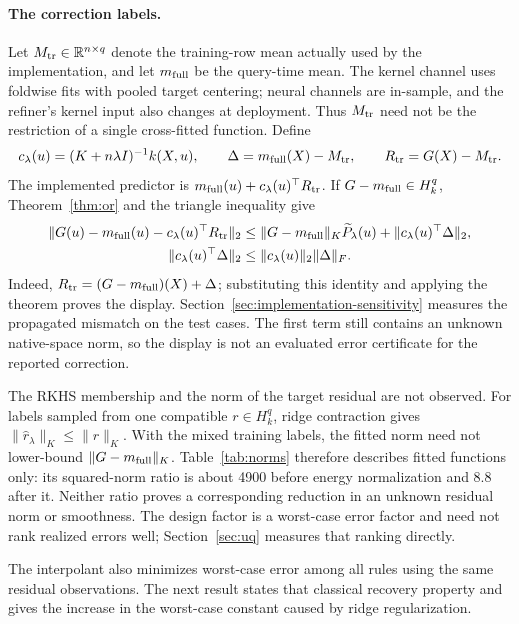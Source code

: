 \paragraph{The correction labels.}
Let $M_{\rm tr}\in\mathbb R^{n\times q}$ denote the training-row mean actually used by the implementation, and let $m_{\rm full}$ be the query-time mean. The kernel channel uses foldwise fits with pooled target centering; neural channels are in-sample, and the refiner's kernel input also changes at deployment. Thus $M_{\rm tr}$ need not be the restriction of a single cross-fitted function. Define
\[
 c_\lambda(u)=(K+n\lambda I)^{-1}k(X,u),\qquad
 \Delta=m_{\rm full}(X)-M_{\rm tr},\qquad
 R_{\rm tr}=G(X)-M_{\rm tr}.
\]
The implemented predictor is $m_{\rm full}(u)+c_\lambda(u)^\top R_{\rm tr}$. If $G-m_{\rm full}\in H_k^q$, Theorem~\ref{thm:or} and the triangle inequality give
\begin{align}
\|G(u)-m_{\rm full}(u)-c_\lambda(u)^\top R_{\rm tr}\|_2
&\le \|G-m_{\rm full}\|_K\widetilde P_\lambda(u)
       +\|c_\lambda(u)^\top\Delta\|_2,\label{eq:mismatch}\\
\|c_\lambda(u)^\top\Delta\|_2&\le\|c_\lambda(u)\|_2\|\Delta\|_F.\nonumber
\end{align}
Indeed, $R_{\rm tr}=(G-m_{\rm full})(X)+\Delta$; substituting this identity and applying the theorem proves the display. Section~\ref{sec:implementation-sensitivity} measures the propagated mismatch on the test cases. The first term still contains an unknown native-space norm, so the display is not an evaluated error certificate for the reported correction.

The RKHS membership and the norm of the target residual are not observed. For labels sampled from one compatible $r\in H_k^q$, ridge contraction gives $\|\widehat r_\lambda\|_K\le\|r\|_K$. With the mixed training labels, the fitted norm need not lower-bound $\|G-m_{\rm full}\|_K$. Table~\ref{tab:norms} therefore describes fitted functions only: its squared-norm ratio is about 4900 before energy normalization and 8.8 after it. Neither ratio proves a corresponding reduction in an unknown residual norm or smoothness. The design factor is a worst-case error factor and need not rank realized errors well; Section~\ref{sec:uq} measures that ranking directly.

The interpolant also minimizes worst-case error among all rules using the
same residual observations. The next result states that classical recovery
property and gives the increase in the worst-case constant caused by ridge
regularization.

